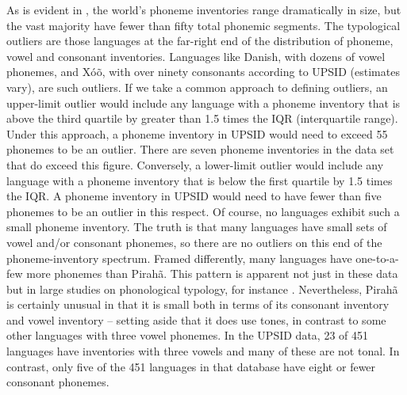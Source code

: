\documentclass[output=paper,colorlinks,citecolor=brown
]{langscibook}
\begin{document}
    As is evident in , the world’s phoneme inventories range dramatically in size, but the vast majority have fewer than fifty total phonemic segments. The typological outliers are those languages at the far-right end of the distribution of phoneme, vowel and consonant inventories. Languages like Danish, with dozens of vowel phonemes, and Xóõ, with over ninety consonants according to UPSID (estimates vary), are such outliers. If we take a common approach to defining outliers, an upper-limit outlier would include any language with a phoneme inventory that is above the third quartile by greater than 1.5 times the IQR (interquartile range). Under this approach, a phoneme inventory in UPSID would need to exceed 55 phonemes to be an outlier. There are seven phoneme inventories in the data set that do exceed this figure. Conversely, a lower-limit outlier would include any language with a phoneme inventory that is below the first quartile by 1.5 times the IQR. A phoneme inventory in UPSID would need to have fewer than five phonemes to be an outlier in this respect. Of course, no languages exhibit such a small phoneme inventory. The truth is that many languages have small sets of vowel and/or consonant phonemes, so there are no outliers on this end of the phoneme-inventory spectrum. Framed differently, many languages have one-to-a-few more phonemes than Pirahã. This pattern is apparent not just in these data but in large studies on phonological typology, for instance . Nevertheless, Pirahã is certainly unusual in that it is small both in terms of its consonant inventory and vowel inventory -- setting aside that it does use tones, in contrast to some other languages with three vowel phonemes. In the UPSID data, 23 of 451 languages have inventories with three vowels and many of these are not tonal. In contrast, only five of the 451 languages in that database have eight or fewer consonant phonemes. 
    
\end{document}
